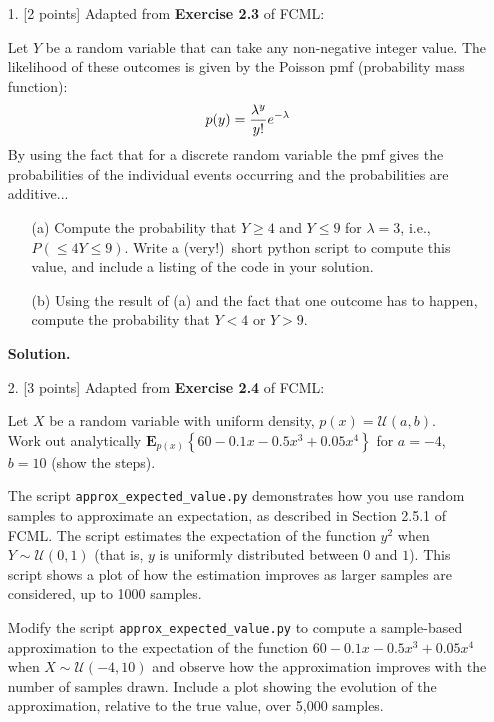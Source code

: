 \documentclass[10pt]{article}
\begin{document}
\newpage
\begin{itemize}

\item[1.] [2 points]
Adapted from {\bf Exercise 2.3} of FCML:

Let $Y$ be a random variable that can take any non-negative integer value.  The likelihood of these outcomes is given by the Poisson pmf (probability mass function):
\begin{eqnarray}
p(y) = {\lambda^y\over y!} e^{-\lambda}
\end{eqnarray}
By using the fact that for a discrete random variable the pmf gives the probabilities of the individual events occurring and the probabilities are additive...
\begin{enumerate}
\item[(a)] Compute the probability that $Y \geq 4$ and $Y \leq 9$ for $\lambda = 3$, i.e., $P(\leq 4Y \leq 9)$.  Write a (very!)~short python script to compute this value, and include a listing of the code in your solution.
\item[(b)] Using the result of (a) and the fact that one outcome has to happen, compute the probability that $Y < 4$ or $Y > 9$.
\end{enumerate}

{\bf Solution.} %


\item[2.] [3 points]
Adapted from {\bf Exercise 2.4} of FCML:

Let $X$ be a random variable with uniform density, $p(x) = \mathcal{U}(a,b)$.  \\
Work out analytically $\mathbf{E}_{p(x)} \left\{ 60 - 0.1x - 0.5x^3 + 0.05x^4 \right\}$ for $a=-4$, $b=10$ (show the steps).  

The script {\tt approx\_expected\_value.py} demonstrates how you use random samples to approximate an expectation, as described in Section 2.5.1 of FCML.  The script estimates the expectation of the function $y^2$ when $Y \sim \mathcal{U}(0,1)$ (that is, $y$ is uniformly distributed between $0$ and $1$).  This script shows a plot of how the estimation improves as larger samples are considered, up to 1000 samples.

Modify the script {\tt approx\_expected\_value.py} to compute a sample-based approximation to the expectation of the function $60 - 0.1x - 0.5x^3 + 0.05x^4$ when $X \sim \mathcal{U}(-4,10)$ and observe how the approximation improves with the number of samples drawn.  Include a plot showing the evolution of the approximation, relative to the true value, over 5,000 samples.


\end{itemize}
\end{document}

